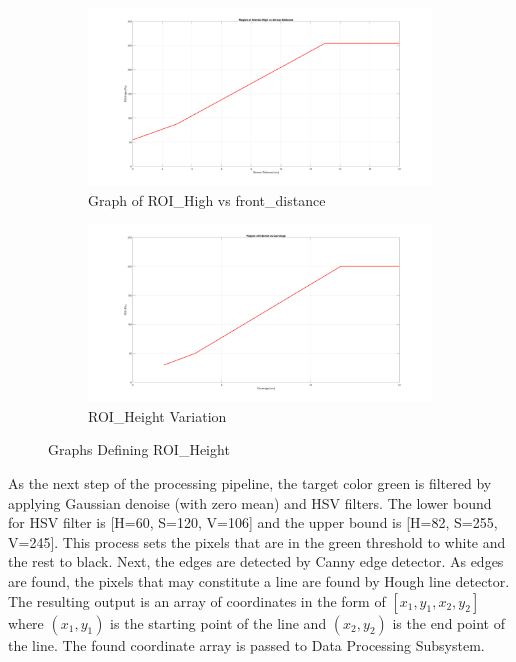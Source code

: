\documentclass[a4paper,12pt]{article}
\begin{document}
\begin{enumerate}[A.]
\begin{figure}[t!]
	\begin{subfigure}{.46\textwidth}
		
		\centering
		
		\includegraphics[width=0.44\unitlength]{images/ROT_ROI/ROI_HIGH}
		
		\caption{ Graph of ROI\_High vs front\_distance}
		
	\end{subfigure}%
	\begin{subfigure}{.46\textwidth}
		
		\centering
		
		\includegraphics[width=0.44\unitlength]{images/ROT_ROI/ROI}
		
		\caption{ ROI\_Height Variation}
		
	\end{subfigure}
	
	\caption{\label{fig:ROI_crop} Graphs Defining ROI\_Height}
	
\end{figure}

As the next step of the processing pipeline, the target color green is filtered by applying Gaussian denoise (with zero mean) and HSV filters. The lower bound for HSV filter is [H=60, S=120, V=106] and the upper bound is [H=82, S=255, V=245]. This process sets the pixels that are in the green threshold to white and the rest to black. Next, the edges are detected by Canny edge detector. As edges are found, the pixels that may constitute a line are found by Hough line detector. The resulting output is an array of coordinates in the form of $[x_1, y_1, x_2, y_2]$ where $(x_1, y_1)$ is the starting point of the line and $(x_2, y_2)$ is the end point of the line. The found coordinate array is passed to Data Processing Subsystem.






\end{enumerate}
\end{document}
